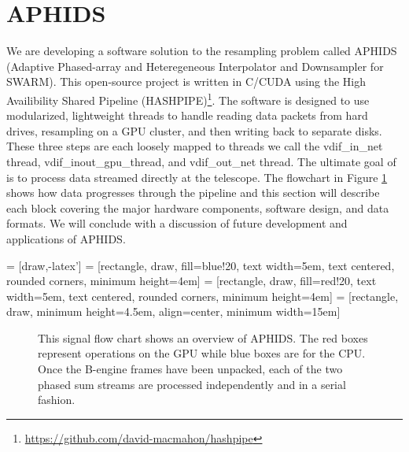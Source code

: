 \section{APHIDS} \label{sec:aphids}

We are developing a software solution to the resampling problem called APHIDS (Adaptive 
Phased-array and 
Heteregeneous Interpolator and Downsampler for SWARM).  This open-source project is written in C/CUDA using
the High Availibility Shared Pipeline 
(HASHPIPE)\footnote{\url{https://github.com/david-macmahon/hashpipe}}.  The software is designed to use 
modularized, lightweight threads to handle reading data packets from hard drives, resampling on a GPU cluster, 
and then writing back to separate disks.  These three steps are each loosely mapped to threads we call the 
vdif\_in\_net thread, vdif\_inout\_gpu\_thread, and vdif\_out\_net thread. 
The ultimate goal of is to process data streamed directly at the telescope.  The flowchart in Figure 
\ref{fig:aphids_flow_chart} shows how data progresses 
through the pipeline and this section will describe each block covering the major hardware components, software 
design, and data formats.  We will conclude with a discussion of future development and applications of APHIDS.

 = [draw,-latex']
 = [rectangle, draw, fill=blue!20,
    text width=5em, text centered, rounded corners, minimum height=4em]
 = [rectangle, draw, fill=red!20,
    text width=5em, text centered, rounded corners, minimum height=4em]
 = [rectangle, draw, minimum height=4.5em, align=center, minimum width=15em] 

\begin{figure}[t]
\linespread{1.}\selectfont{}
\begin{center}
\label{fig:aphids_flow_chart}
\caption{This signal flow chart shows an overview of APHIDS.  The red boxes represent operations on the GPU 
while blue boxes are for the CPU.  Once the B-engine frames have been unpacked, each of the two phased sum 
streams are processed independently and in a serial fashion.}
\end{center}
\end{figure}

